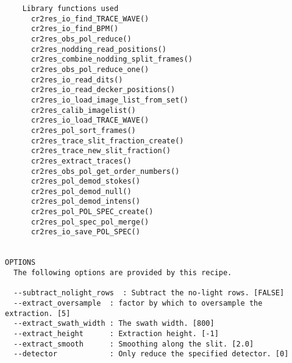 \begin{verbatim}
    Library functions used                                                
      cr2res_io_find_TRACE_WAVE()                                         
      cr2res_io_find_BPM()                                                
      cr2res_obs_pol_reduce()                                             
      cr2res_nodding_read_positions()                                     
      cr2res_combine_nodding_split_frames()                               
      cr2res_obs_pol_reduce_one()                                         
      cr2res_io_read_dits()                                               
      cr2res_io_read_decker_positions()                                   
      cr2res_io_load_image_list_from_set()                                
      cr2res_calib_imagelist()                                            
      cr2res_io_load_TRACE_WAVE()                                         
      cr2res_pol_sort_frames()                                            
      cr2res_trace_slit_fraction_create()                                 
      cr2res_trace_new_slit_fraction()                                    
      cr2res_extract_traces()                                             
      cr2res_obs_pol_get_order_numbers()                                  
      cr2res_pol_demod_stokes()                                           
      cr2res_pol_demod_null()                                             
      cr2res_pol_demod_intens()                                           
      cr2res_pol_POL_SPEC_create()                                        
      cr2res_pol_spec_pol_merge()                                         
      cr2res_io_save_POL_SPEC()                                           
  

OPTIONS
  The following options are provided by this recipe.

  --subtract_nolight_rows  : Subtract the no-light rows. [FALSE]
  --extract_oversample  : factor by which to oversample the extraction. [5]
  --extract_swath_width : The swath width. [800]
  --extract_height      : Extraction height. [-1]
  --extract_smooth      : Smoothing along the slit. [2.0]
  --detector            : Only reduce the specified detector. [0]

\end{verbatim}

